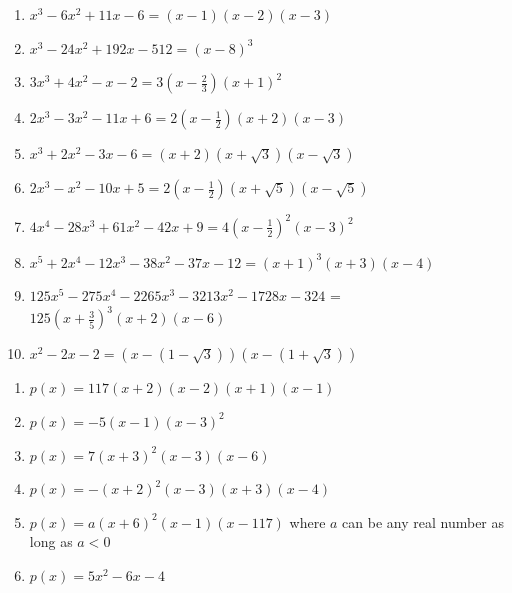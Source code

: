 \begin{enumerate}
\setcounter{enumi}{\value{HW}}

\item $x^{3} - 6x^{2} + 11x - 6 = (x - 1)(x - 2)(x - 3)$
\item $x^{3} - 24x^{2} + 192x - 512 = (x - 8)^{3}$
\item $3x^{3} + 4x^{2} - x - 2 = 3\left(x - \frac{2}{3}\right)(x + 1)^{2}$

\item $2x^3-3x^2-11x+6 = 2\left(x-\frac{1}{2}\right)(x+2)(x-3)$

\item $x^3+2x^2-3x-6 = (x+2)(x+\sqrt{3})(x-\sqrt{3})$
\item $2x^3-x^2-10x+5=2\left(x-\frac{1}{2}\right)(x+\sqrt{5})(x-\sqrt{5})$

\item $4x^{4} - 28x^{3} + 61x^{2} - 42x + 9 = 4\left(x - \frac{1}{2} \right)^{2}(x - 3)^{2}$

\item  $x^5+2x^4-12x^3-38x^2-37x-12 = (x+1)^3(x+3)(x-4)$

\item $125x^{5} - 275x^{4} - 2265x^{3} - 3213x^{2} - 1728x - 324$ = $125\left(x + \frac{3}{5} \right)^{3}(x + 2)(x - 6)$


\item $x^{2} - 2x - 2 = (x - (1 - \sqrt{3}))(x - (1 + \sqrt{3}))$

\setcounter{HW}{\value{enumi}}
\end{enumerate}

\begin{enumerate}
\setcounter{enumi}{\value{HW}}

\item $p(x) = 117(x+2)(x-2)(x+1)(x-1)$

\item $p(x)= -5(x-1)(x-3)^2$

\item  $p(x) = 7(x+3)^2(x-3)(x-6)$

\item $p(x) = -(x + 2)^{2}(x - 3)(x + 3)(x - 4)$

\item $p(x) = a(x+6)^2(x-1)(x-117)$ where $a$ can be any real number as long as $a<0$

\item $p(x) = 5x^{2} - 6x - 4$


\end{enumerate}

\closegraphsfile